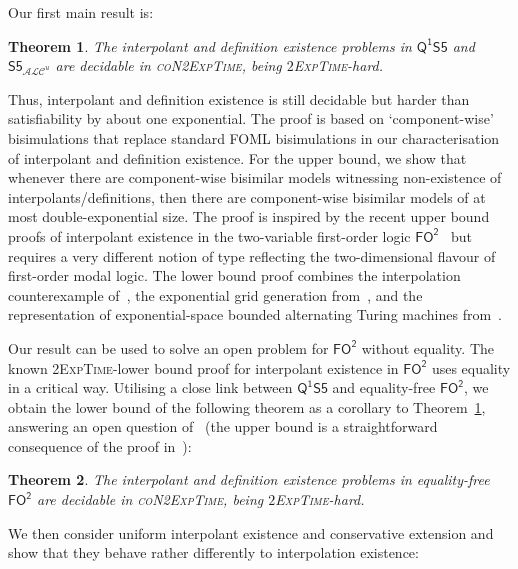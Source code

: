 \documentclass[10pt,a4paper]{amsart}
\theoremstyle{plain}
\newtheorem{thm}{Theorem}[section]
\theoremstyle{definition}
\newcommand{\nb}[1]{\textcolor{red}{\bf!}%
	\marginpar[\parbox{15mm}{\raggedleft\scriptsize\textcolor{red}{#1}}]%
	{\parbox{15mm}{\raggedright\scriptsize\textcolor{red}{#1}}}}
\newcommand{\FOT}{\ensuremath{\mathsf{FO^2}}}
\newcommand{\FOMS}{\ensuremath{\mathsf{Q^1S5}}}
\newcommand{\ALCS}{\ensuremath{\mathsf{S5}_{\mathcal{ALC}^u}}}
\begin{document}
Our first main result is:


\begin{thm}\label{thm1intro}
The interpolant and definition existence problems in \FOMS{} and \ALCS{} are decidable in \textsc{coN2ExpTime}, being $2$\textsc{ExpTime}-hard.
\end{thm}


Thus, interpolant and definition existence is still decidable but harder than satisfiability by about one exponential. The proof is based on `component-wise' bisimulations that replace standard FOML bisimulations in our characterisation of interpolant and definition existence. For the upper bound, we show that whenever there are component-wise bisimilar models 
witnessing non-existence of interpolants/definitions, then there are component-wise bisimilar models of at most double-exponential size. The proof is inspired by the recent upper bound proofs of interpolant existence in the two-variable first-order logic \FOT{}~\cite{DBLP:conf/lics/JungW21} but requires a very different notion of type reflecting the two-dimensional flavour of first-order modal logic. 
The lower bound proof combines the interpolation counterexample  of~\cite{DBLP:journals/ndjfl/MarxA98}, the exponential grid generation from~\cite{DBLP:conf/time/HodkinsonKKWZ03,DBLP:journals/tocl/GollerJL15}, and the representation of exponential-space bounded alternating Turing machines from~\cite{DBLP:conf/lics/JungW21}. 

Our result can be used to solve an open problem for $\FOT{}$ without equality. The known 2\textsc{ExpTime}-lower bound proof for interpolant existence in $\FOT{}$ uses equality in a critical way. Utilising a close link
between \FOMS{} and equality-free \FOT{}, we obtain the lower bound of the following theorem as a corollary to Theorem~\ref{thm1intro}, answering an open question of~\cite{DBLP:conf/lics/JungW21}
(the upper bound is a straightforward consequence of the proof in~\cite{DBLP:conf/lics/JungW21}):


\begin{thm}\label{thm2intro}
The interpolant and definition existence problems in equality-free \FOT{} 
are decidable in \textsc{coN2\-Exp\-Time}, being $2$\textsc{ExpTime}-hard.
\end{thm}


We then consider uniform interpolant existence and conservative extension and show that they behave rather differently to interpolation existence:
\end{document}
